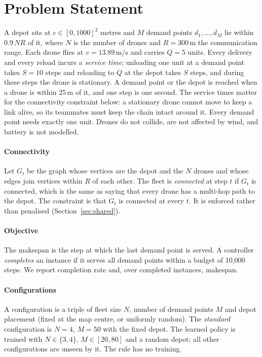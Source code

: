 \documentclass[final,5p,times,twocolumn]{elsarticle}
\begin{document}
\section{Problem Statement}
\label{sec:problem}

A depot sits at $c \in [0,1000]^2$ metres and $M$ demand points $d_1,\dots,d_M$ lie
within $0.9\,N R$ of it, where $N$ is the number of drones and $R = 300$\,m the communication
range. Each drone flies at $v = 13.89$\,m/s and carries $Q = 5$ units. Every delivery and every
reload incurs a \emph{service time}: unloading one unit at a demand point takes $S = 10$ steps and
reloading to $Q$ at the depot takes $S$ steps, and during these steps the drone is stationary.
A demand point or the depot is reached when a drone is within 25\,m of it, and one step is one
second. The service times matter for the connectivity constraint below: a stationary drone
cannot move to keep a link alive, so its teammates must keep the chain intact around it. Every
demand point needs exactly one unit. Drones do not collide, are not affected by wind, and battery
is not modelled.

\paragraph{Connectivity}
Let $G_t$ be the graph whose vertices are the depot and the $N$ drones and whose edges join
vertices within $R$ of each other. The fleet is \emph{connected} at step $t$ if $G_t$ is
connected, which is the same as saying that every drone has a multi-hop path to the depot. The
constraint is that $G_t$ is connected at every $t$. It is enforced rather than penalised
(Section~\ref{sec:shared}).

\paragraph{Objective}
The makespan is the step at which the last demand point is served. A controller \emph{completes}
an instance if it serves all demand points within a budget of 10{,}000 steps. We report completion
rate and, over completed instances, makespan.

\paragraph{Configurations}
A configuration is a triple of fleet size $N$, number of demand points $M$ and depot placement
(fixed at the map centre, or uniformly random). The \emph{standard} configuration is $N=4$,
$M=50$ with the fixed depot. The learned policy is trained with $N \in \{3,4\}$, $M \in [20,80]$
and a random depot; all other configurations are unseen by it. The rule has no training.
\end{document}
